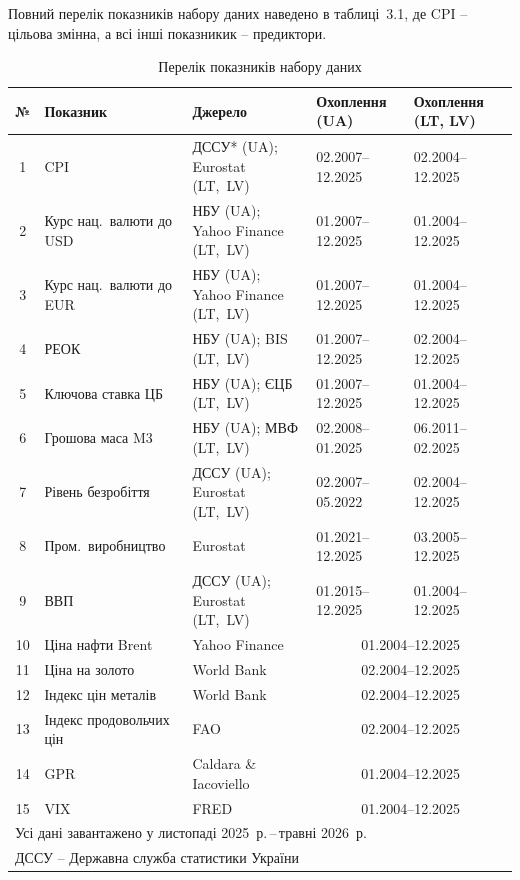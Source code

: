 \documentclass{bachelor_thesis}
\begin{document}
Повний перелік показників набору даних наведено в таблиці~3.1, де CPI -- цільова змінна, а всі інші показникик -- предиктори.

\begin{table}[h!]
\centering
\small
\label{tab:dataset}
\begin{tabularx}{\textwidth}{@{}cp{3.0cm}Xp{2.5cm}p{2.5cm}@{}}
\hline
\textbf{№} & \textbf{Показник} & \textbf{Джерело} &
\textbf{Охоплення (UA)} & \textbf{Охоплення (LT, LV)} \\
\hline
1  & CPI         & ДССУ* (UA); Eurostat (LT,~LV)            & 02.2007--12.2025 & 02.2004--12.2025 \\
2  & Курс нац.\ валюти до USD      & НБУ (UA); Yahoo Finance (LT,~LV)          & 01.2007--12.2025 & 01.2004--12.2025 \\
3  & Курс нац.\ валюти до EUR      & НБУ (UA); Yahoo Finance (LT,~LV)         & 01.2007--12.2025 & 01.2004--12.2025 \\
4  & РЕОК                          & НБУ (UA); BIS (LT,~LV)                        & 01.2007--12.2025              & 02.2004--12.2025 \\
5  & Ключова ставка ЦБ             & НБУ (UA); ЄЦБ (LT,~LV)             & 01.2007--12.2025              & 01.2004--12.2025 \\
6  & Грошова маса M3               & НБУ (UA); МВФ (LT,~LV)                   & 02.2008--01.2025 & 06.2011--02.2025 \\
7  & Рівень безробіття             & ДССУ (UA); Eurostat (LT,~LV)     & 02.2007--05.2022 & 02.2004--12.2025 \\
8  & Пром.\ виробництво            & Eurostat                           & 01.2021--12.2025 & 03.2005--12.2025 \\
9  & ВВП            & ДССУ (UA); Eurostat (LT,~LV) & 01.2015--12.2025 & 01.2004--12.2025 \\
\hline
10 & Ціна нафти Brent              & Yahoo Finance                            & \multicolumn{2}{c}{01.2004--12.2025} \\
11 & Ціна на золото                & World Bank                                & \multicolumn{2}{c}{02.2004--12.2025} \\
12 & Індекс цін металів            & World Bank                      & \multicolumn{2}{c}{02.2004--12.2025} \\
13 & Індекс продовольчих цін       & FAO                                      & \multicolumn{2}{c}{02.2004--12.2025} \\
14 & GPR                           & Caldara \& Iacoviello                         & \multicolumn{2}{c}{01.2004--12.2025} \\
15 & VIX                           & FRED                           & \multicolumn{2}{c}{01.2004--12.2025} \\
\hline
\multicolumn{5}{l}{\footnotesize Усі дані завантажено у листопаді 2025~р.\,--\,травні 2026~р.} \\
\multicolumn{5}{l}{\footnotesize * ДССУ -- Державна служба статистики України} \\
\end{tabularx}
\caption{Перелік показників набору даних}
\end{table}
\end{document}
